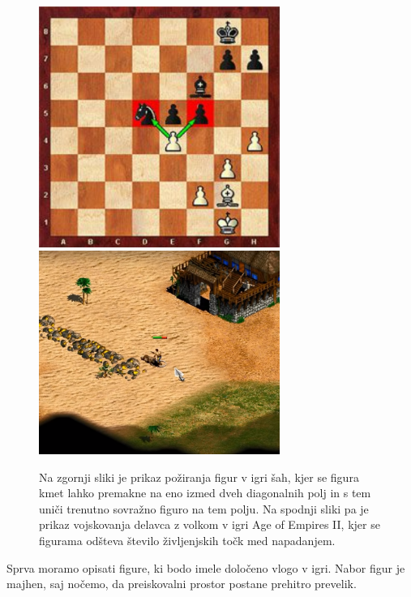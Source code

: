\documentclass[a4paper, 12pt]{book}
\begin{document}
\begin{figure}[h]
	\begin{center}
		\includegraphics[width=0.7\textwidth]{photos/chess_capture.pdf}
		\includegraphics[width=0.7\textwidth]{photos/health_reduced.pdf}
	\end{center}
	\caption{Na zgornji sliki je prikaz požiranja figur v igri šah, kjer se figura kmet lahko premakne na eno izmed dveh diagonalnih polj in s tem uniči trenutno sovražno figuro na tem polju. 
		Na spodnji sliki pa je prikaz vojskovanja delavca z volkom v igri Age of Empires II, kjer se figurama odšteva število življenjskih točk med napadanjem.}
	\label{picPoziranjeFigur}
\end{figure}





Sprva moramo opisati figure, ki bodo imele določeno vlogo v igri. Nabor figur je majhen, saj nočemo, da preiskovalni prostor postane prehitro prevelik.
\end{document}
